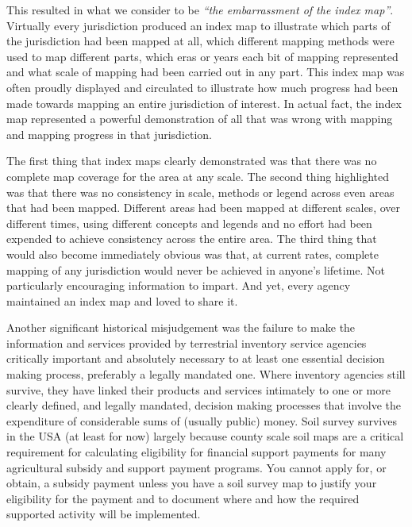 \documentclass[graybox,natbib,nospthms,UStrade]{svmono}
\begin{document}
This resulted in what we consider to be \emph{``the embarrassment of the index
map''}. Virtually every jurisdiction produced an index map to illustrate
which parts of the jurisdiction had been mapped at all, which different
mapping methods were used to map different parts, which eras or years
each bit of mapping represented and what scale of mapping had been
carried out in any part. This index map was often proudly displayed and
circulated to illustrate how much progress had been made towards mapping
an entire jurisdiction of interest. In actual fact, the index map
represented a powerful demonstration of all that was wrong with mapping
and mapping progress in that jurisdiction.

The first thing that index maps clearly demonstrated was that there was
no complete map coverage for the area at any scale. The second thing
highlighted was that there was no consistency in scale, methods or
legend across even areas that had been mapped. Different areas had been
mapped at different scales, over different times, using different
concepts and legends and no effort had been expended to achieve
consistency across the entire area. The third thing that would also
become immediately obvious was that, at current rates, complete mapping
of any jurisdiction would never be achieved in anyone's lifetime. Not
particularly encouraging information to impart. And yet, every agency
maintained an index map and loved to share it.

Another significant historical misjudgement was the failure to make the
information and services provided by terrestrial inventory service
agencies critically important and absolutely necessary to at least one
essential decision making process, preferably a legally mandated one.
Where inventory agencies still survive, they have linked their products
and services intimately to one or more clearly defined, and legally
mandated, decision making processes that involve the expenditure of
considerable sums of (usually public) money. Soil survey survives in the
USA (at least for now) largely because county scale soil maps are a
critical requirement for calculating eligibility for financial support
payments for many agricultural subsidy and support payment programs. You
cannot apply for, or obtain, a subsidy payment unless you have a soil
survey map to justify your eligibility for the payment and to document
where and how the required supported activity will be implemented.
\end{document}
